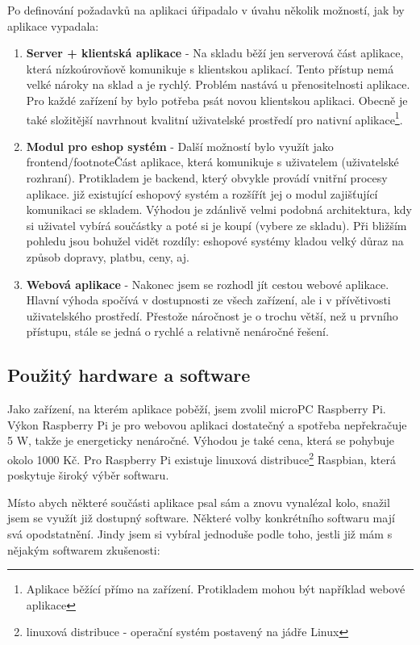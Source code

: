 \documentclass[12pt, a4paper, oneside]{article}
\begin{document}
Po definování požadavků na aplikaci úřipadalo v úvahu několik možností, jak by aplikace vypadala:

\begin{enumerate}
\item \textbf{Server + klientská aplikace} - Na skladu běží jen serverová část aplikace, která nízkoúrovňově komunikuje s klientskou aplikací. Tento přístup nemá velké nároky na sklad a je rychlý. Problém nastává u přenositelnosti aplikace. Pro každé zařízení by bylo potřeba psát novou klientskou aplikaci. Obecně je také složitější navrhnout kvalitní uživatelské prostředí pro nativní aplikace\footnote{Aplikace běžící přímo na zařízení. Protikladem mohou být například webové aplikace}.
\item \textbf{Modul pro eshop systém} - Další možností bylo využít jako frontend/footnote{Část aplikace, která komunikuje s uživatelem (uživatelské rozhraní). Protikladem je backend, který obvykle provádí vnitřní procesy aplikace.} již existující eshopový systém a rozšířít jej o modul zajišťující komunikaci se skladem. Výhodou je zdánlivě velmi podobná architektura, kdy si uživatel vybírá součástky a poté si je koupí (vybere ze skladu). Při bližším pohledu jsou bohužel vidět rozdíly: eshopové systémy kladou velký důraz na způsob dopravy, platbu, ceny, aj.
\item \textbf{Webová aplikace} - Nakonec jsem se rozhodl jít cestou webové aplikace. Hlavní výhoda spočívá v dostupnosti ze všech zařízení, ale i v přívětivosti uživatelského prostředí. Přestože náročnost je o trochu větší, než u prvního přístupu, stále se jedná o rychlé a relativně nenáročné řešení.
\end{enumerate}


\subsection{Použitý hardware a software}

Jako zařízení, na kterém aplikace poběží, jsem zvolil microPC Raspberry Pi. Výkon Raspberry Pi je pro webovou aplikaci dostatečný a spotřeba nepřekračuje 5 W, takže je energeticky nenáročné. Výhodou je také cena, která se pohybuje okolo 1000 Kč. Pro Raspberry Pi existuje linuxová distribuce\footnote{linuxová distribuce - operační systém postavený na jádře Linux} Raspbian, která poskytuje široký výběr softwaru.

Místo abych některé součásti aplikace psal sám a znovu vynalézal kolo, snažil jsem se využít již dostupný software. Některé volby konkrétního softwaru mají svá opodstatnění. Jindy jsem si vybíral jednoduše podle toho, jestli již mám s nějakým softwarem zkušenosti:
\end{document}
